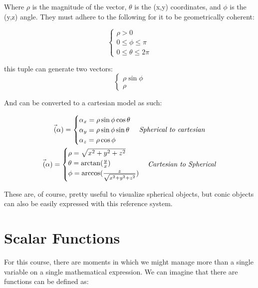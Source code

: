 \documentclass[11pt,fleqn]{book} %
\begin{document}
Where $ \rho $ is the magnitude of the vector, $\theta$ is the (x,y) coordinates, and
$\phi$ is the (y,z) angle. They must adhere to the following for it to be geometrically coherent:

\begin{equation}
    \begin{cases}
        \rho > 0 \\
        0 \le \phi \le \pi \\
        0 \le \theta \le 2\pi
    \end{cases}
\end{equation}

this tuple can generate two vectors:
\begin{equation}
    \begin{cases}
        \rho \sin \phi\\
        \rho
    \end{cases}
\end{equation}

And can be converted to a cartesian model as such:

\begin{gather}
    \vec(\alpha) =
    \begin{cases}
        \alpha_x = \rho \sin \phi \cos \theta \\
        \alpha_y = \rho \sin \phi \sin \theta \\
        \alpha_z = \rho \cos \phi
    \end{cases}
    \text{\textit{Spherical to cartesian}} \\ 
    \vec(\alpha) =
    \begin{cases}
        \rho = \sqrt{x^2 + y^2 + z^2} \\
        \theta =  \arctan(\frac{y}{x}) \\
        \phi = \arccos(\frac{z}{\sqrt{x^2+y^2+z^2}})
    \end{cases}
    \text{\textit{Cartesian to Spherical}}
\end{gather}

These are, of course, pretty useful to visualize spherical objects, but conic objects can also be easily expressed with this reference system.

\section{Scalar Functions}

For this course, there are moments in which we might manage more than a single variable on a single mathematical expression. 
We can imagine that there are functions can be defined as: 
\end{document}
